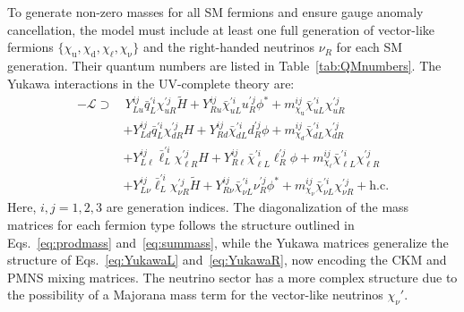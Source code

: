 To generate non-zero masses for all SM fermions and ensure gauge anomaly cancellation, the model must include at least one full generation of vector-like fermions $\{\chi_\mathrm{u}, \chi_\mathrm{d}, \chi_\mathrm{\ell}, \chi_\mathrm{\nu}\}$ and the right-handed neutrinos $\nu_R$ for each SM generation. Their quantum numbers are listed in Table~\ref{tab:QMnumbers}. The Yukawa interactions in the UV-complete theory are:
\begin{equation}
    \begin{aligned}
        -\mathcal{L} \supset&\,
        Y_{L u}^{ij} \bar{q}_L^{\prime i} \chi_{u R}^{\prime j} \widetilde{H}
        + Y_{R u}^{ij} \bar{\chi}_{u L}^{\prime i} u_R^{\prime j} \phi^*
        + m_{\chi_\mathrm{u}}^{ij} \bar{\chi}_{u L}^{\prime i} \chi_{u R}^{\prime j} \\
        &+ Y_{L d}^{ij} \bar{q}_L^{\prime i} \chi_{d R}^{\prime j} H
        + Y_{R d}^{ij} \bar{\chi}_{d L}^{\prime i} d_R^{\prime j} \phi
        + m_{\chi_d}^{ij} \bar{\chi}_{d L}^{\prime i} \chi_{d R}^{\prime j} \\
        &+ Y_{L \ell}^{ij} \bar{\ell}_L^{\prime i} \chi_{\ell R}^{\prime j} H
        + Y_{R \ell}^{ij} \bar{\chi}_{\ell L}^{\prime i} \ell_R^{\prime j} \phi
        + m_{\chi_\ell}^{ij} \bar{\chi}_{\ell L}^{\prime i} \chi_{\ell R}^{\prime j} \\
        &+ Y_{L \nu}^{ij} \bar{\ell}_L^{\prime i} \chi_{\nu R}^{\prime j} \widetilde{H}
        + Y_{R \nu}^{ij} \bar{\chi}_{\nu L}^{\prime i} \nu_R^{\prime j} \phi^*
        + m_{\chi_\nu}^{ij} \bar{\chi}_{\nu L}^{\prime i} \chi_{\nu R}^{\prime j}
        + \text{h.c.}
    \end{aligned}
\end{equation}
Here, $i, j = 1,2,3$ are generation indices. The diagonalization of the mass matrices for each fermion type follows the structure outlined in Eqs.~\eqref{eq:prodmass} and~\eqref{eq:summass}, while the Yukawa matrices generalize the structure of Eqs.~\eqref{eq:YukawaL} and~\eqref{eq:YukawaR}, now encoding the CKM and PMNS mixing matrices. The neutrino sector has a more complex structure due to the possibility of a Majorana mass term for the vector-like neutrinos $\chi_\nu'$.

